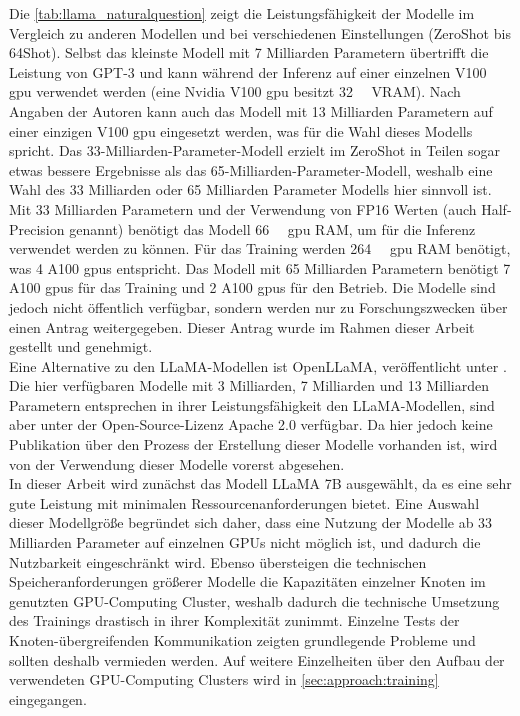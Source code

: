 Die \cref{tab:llama_naturalquestion} zeigt die Leistungsfähigkeit der Modelle im Vergleich zu anderen Modellen und bei verschiedenen Einstellungen (ZeroShot bis 64Shot).
Selbst das kleinste Modell mit 7 Milliarden Parametern übertrifft die Leistung von GPT-3 und kann während der Inferenz auf einer einzelnen V100 \ac{gpu} verwendet werden (eine Nvidia V100 \ac{gpu} besitzt \SI{32}{\giga\byte} VRAM).
Nach Angaben der Autoren kann auch das Modell mit 13 Milliarden Parametern auf einer einzigen V100 \ac{gpu} eingesetzt werden, was für die Wahl dieses Modells spricht.
Das 33-Milliarden-Parameter-Modell erzielt im ZeroShot in Teilen sogar etwas bessere Ergebnisse als das 65-Milliarden-Parameter-Modell, weshalb eine Wahl des 33 Milliarden oder 65 Milliarden Parameter Modells hier sinnvoll ist.
Mit 33 Milliarden Parametern und der Verwendung von FP16 Werten (auch Half-Precision genannt) benötigt das Modell \SI{66}{\giga\byte} \ac{gpu} RAM, um für die Inferenz verwendet werden zu können.
Für das Training werden \SI{264}{\giga\byte} \ac{gpu} RAM benötigt, was 4 A100 \ac{gpu}s entspricht.
Das Modell mit 65 Milliarden Parametern benötigt 7 A100 \ac{gpu}s für das Training und 2 A100 \ac{gpu}s für den Betrieb.
Die Modelle sind jedoch nicht öffentlich verfügbar, sondern werden nur zu Forschungszwecken über einen Antrag weitergegeben.
Dieser Antrag wurde im Rahmen dieser Arbeit gestellt und genehmigt.\\

Eine Alternative zu den LLaMA-Modellen ist OpenLLaMA, veröffentlicht unter \citet{openllama}.
Die hier verfügbaren Modelle mit 3 Milliarden, 7 Milliarden und 13 Milliarden Parametern entsprechen in ihrer Leistungsfähigkeit den LLaMA-Modellen, sind aber unter der Open-Source-Lizenz Apache 2.0 verfügbar. Da hier jedoch keine Publikation über den Prozess der Erstellung dieser Modelle vorhanden ist, wird von der Verwendung dieser Modelle vorerst abgesehen.\\

In dieser Arbeit wird zunächst das Modell LLaMA 7B ausgewählt, da es eine sehr gute Leistung mit minimalen Ressourcenanforderungen bietet.
Eine Auswahl dieser Modellgröße begründet sich daher, dass eine Nutzung der Modelle ab 33 Milliarden Parameter auf einzelnen GPUs nicht möglich ist, und dadurch die Nutzbarkeit eingeschränkt wird.
Ebenso übersteigen die technischen Speicheranforderungen größerer Modelle die Kapazitäten einzelner Knoten im genutzten GPU-Computing Cluster, weshalb dadurch die technische Umsetzung des Trainings drastisch in ihrer Komplexität zunimmt.
Einzelne Tests der Knoten-übergreifenden Kommunikation zeigten grundlegende Probleme und sollten deshalb vermieden werden.
Auf weitere Einzelheiten über den Aufbau der verwendeten GPU-Computing Clusters wird in \cref{sec:approach:training} eingegangen.\\

